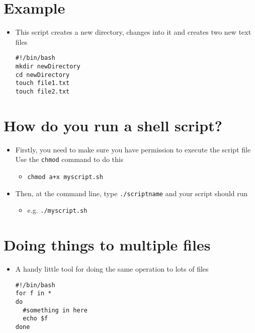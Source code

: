 \documentclass{article}
\begin{document}
\section{Example}
\begin{itemize}
\item This script creates a new directory, changes into it and creates two new text files
\begin{verbatim}
#!/bin/bash
mkdir newDirectory
cd newDirectory
touch file1.txt
touch file2.txt 
\end{verbatim}
\end{itemize}



\section{How do you run a shell script?}
\begin{itemize}
\item Firstly, you need to make sure you have permission to execute the script file
Use the \verb!chmod! command to do this
\begin{itemize}
\item \verb!chmod a+x myscript.sh!
\end{itemize}

\item Then, at the command line, type \verb!./scriptname! and your script should run
\begin{itemize}
\item e.g. \verb!./myscript.sh!
\end{itemize}
\end{itemize}



\section{Doing things to multiple files}
\begin{itemize}
\item A handy little tool for doing the same operation to lots of files
\begin{verbatim}
#!/bin/bash
for f in *
do
  #something in here
  echo $f
done
\end{verbatim}
\end{itemize}
\end{document}
